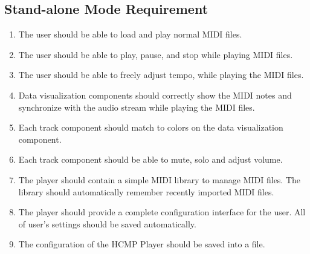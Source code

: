 \subsection{Stand-alone Mode Requirement}
\begin{enumerate}
  \item The user should be able to load and play normal MIDI files.
  \item The user should be able to play, pause, and stop while playing MIDI files.  
  \item The user should be able to freely adjust tempo, while playing the MIDI files.
  \item Data visualization components should correctly show the MIDI notes 
        and synchronize with the audio stream while playing the MIDI files.
  \item Each track component should match to colors on the data visualization 
        component.
  \item Each track component should be able to mute, solo and adjust volume.  
  \item The player should contain a simple MIDI library to manage MIDI files. 
        The library should automatically remember recently imported MIDI files.
  \item The player should provide a complete configuration interface for the 
        user. All of user's settings should be saved automatically.
  \item The configuration of the HCMP Player should be saved into a file.
\end{enumerate}

